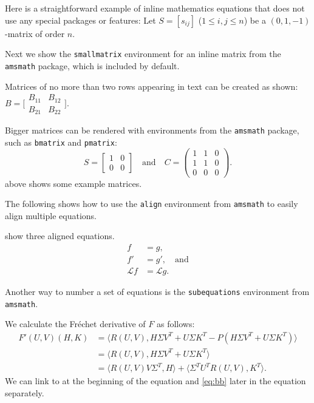 \documentclass[twoside,leqno]{article}
\begin{document}
Here is a straightforward example of inline mathematics
equations that does not use any special packages or features: 
Let $S=[s_{ij}]$ ($1\leq i,j\leq n$) be a $(0,1,-1)$-matrix of order $n$.

Next we show the \texttt{smallmatrix} environment for an
inline matrix from the \texttt{amsmath} package, which is included by
default.

Matrices of no more than two rows appearing in text can be created
as shown:
$B = \bigl[ \begin{smallmatrix} B_{11} & B_{12} \\ 
  B_{21} & B_{22} \end{smallmatrix} \bigr]$.

Bigger matrices can be rendered with environments from
the \texttt{amsmath} package, such as \texttt{bmatrix} and
\texttt{pmatrix}:
\begin{equation}\label{eq:matrices}
  S=\begin{bmatrix}1&0\\0&0\end{bmatrix}
  \quad\text{and}\quad
  C=\begin{pmatrix}1&1&0\\1&1&0\\0&0&0\end{pmatrix}.
\end{equation}
 above shows some example matrices.

The following shows how to use the \texttt{align} environment from
\texttt{amsmath} to easily align multiple equations.

 show three aligned equations.
\begin{align} 
  f &= g, \label{eq:a} \\
  f' &= g', \quad\text{and} \label{eq:b} \\
  \mathcal{L}f &= \mathcal{L}g \label{eq:c}.
\end{align}

Another way to number a set of equations is the
\texttt{subequations} environment from \texttt{amsmath}.

We calculate the Fr\'{e}chet derivative of $F$ as follows:
\begin{subequations}
\begin{align}
  F'(U,V)(H,K) &= \langle R(U,V),H\Sigma V^{T} + U\Sigma K^{T} - P(H\Sigma V^{T} + U\Sigma K^{T})\rangle  \label{eq:aa} \\
  &= \langle R(U,V),H\Sigma V^{T} + U\Sigma K^{T}\rangle \nonumber \\
  &= \langle R(U,V)V\Sigma^{T},H\rangle + \langle \Sigma^{T}U^{T}R(U,V),K^{T}\rangle. \label{eq:bb} \nonumber
\end{align}
\end{subequations}
We can link to  at the beginning of the equation and \cref{eq:bb} later in the equation separately.
\end{document}
